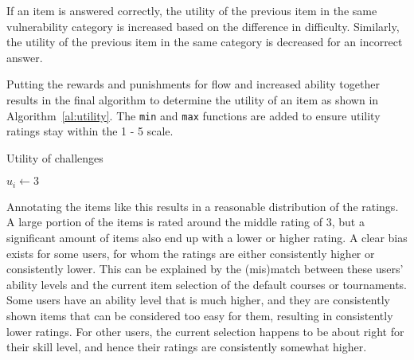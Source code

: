 If an item is answered correctly, the utility of the previous item in the same vulnerability category is increased based on the difference in difficulty.
Similarly, the utility of the previous item in the same category is decreased for an incorrect answer.

Putting the rewards and punishments for flow and increased ability together results in the final algorithm to determine the utility of an item as shown in Algorithm~\ref{al:utility}.
The \texttt{min} and \texttt{max} functions are added to ensure utility ratings stay within the 1 - 5 scale.

\begin{algorithm}[H]
\caption{\label{al:utility}Utility of challenges}
\SetAlgoLined
{}
$u_i \leftarrow 3$\\
    {
    }
\Else
    {
    }
\end{algorithm}

Annotating the items like this results in a reasonable distribution of the ratings.
A large portion of the items is rated around the middle rating of 3, but a significant amount of items also end up with a lower or higher rating.
A clear bias exists for some users, for whom the ratings are either consistently higher or consistently lower.
This can be explained by the (mis)match between these users' ability levels and the current item selection of the default courses or tournaments.
Some users have an ability level that is much higher, and they are consistently shown items that can be considered too easy for them, resulting in consistently lower ratings.
For other users, the current selection happens to be about right for their skill level, and hence their ratings are consistently somewhat higher.